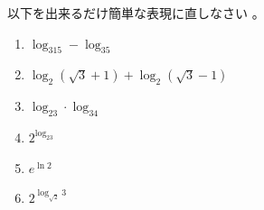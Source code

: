 \documentclass[twocolumn,11pt]{jarticle}
\begin{document}
\exercise
以下を出来るだけ簡単な表現に直しなさい
。
\begin{enumerate}
\item \label{item:log_xy} $\log_315-\log_35$
\item \label{item:log_log} $\log_2(\sqrt{3}+1)+\log_2(\sqrt{3}-1)$
\item \label{item:log_23log_34} $\log_23\cdot\log_34$
\item \label{item:log_23}$2^{\log_23}$
\item \label{item:e^ln2}$e^{\ln 2}$
\item \label{item:2^log}$2^{\log_{\sqrt{2}}3}$
\end{enumerate}

\end{document}
